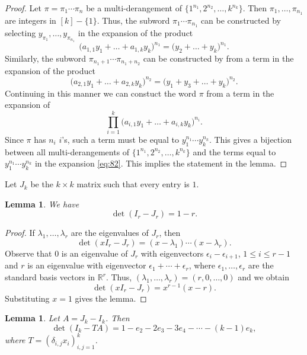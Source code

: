 \documentclass[oneside]{book}
\numberwithin{equation}{section}
\newtheorem{lem}[thm]{Lemma}
\theoremstyle{definition}
\newcommand{\RR}{\mathbb{R}}
\begin{document}
\begin{proof}
  Let \( \pi=\pi_1 \cdots \pi_n \) be a multi-derangement of
  \(\{1^{n_1}, 2^{n_2},\dots,k^{n_k}\}\). Then
  \( \pi_1,\dots,\pi_{n_1} \) are integers in \( [k]-\{1\} \).
  Thus, the subword \( \pi_1\cdots\pi_{n_1} \)
  can be constructed by selecting \( y_{\pi_1},\dots,y_{\pi_{n_1}} \)
  in the expansion of the product
  \[
    \bigl(a_{1,1}y_1 + \dots + a_{1,k}y_k \bigl)^{n_1}
    = \bigl(y_2 + \dots + y_k \bigl)^{n_1}.
  \]
  Similarly, the subword \( \pi_{n_1+1}\cdots\pi_{n_1+n_2} \) can be
  constructed by from a term in the expansion of the product
  \[
    \bigl(a_{2,1}y_1 + \dots + a_{2,k}y_k \bigl)^{n_2}
    = \bigl(y_1+ y_3 + \dots + y_k \bigl)^{n_2}.
  \]
  Continuing in this manner
  we can constuct the word \( \pi \)
  from a term in the expansion of 
  \begin{equation}\label{eq:82}
    \prod_{i=1}^k \bigl(a_{i,1}y_1 + \dots + a_{i,k}y_k \bigl)^{n_i}.
  \end{equation}
  Since \( \pi \) has \( n_i \) \( i \)'s, such a term must be equal
  to \( y_1^{n_1}\cdots y_k^{n_k} \). This gives a bijection between
  all multi-derangements of \(\{1^{n_1}, 2^{n_2},\dots,k^{n_k}\}\) and
  the terms equal to \( y_1^{n_1}\cdots y_k^{n_k} \) in the expansion
  \eqref{eq:82}. This implies the statement in the lemma.
\end{proof}

Let \( J_k \) be the \( k\times k \) matrix such that every entry is
\( 1 \).

\begin{lem}\label{lem:12}
  We have 
  \[
    \det(I_{r}-J_{r}) = 1-r.
  \]
\end{lem}

\begin{proof}
  If \( \lambda_1,\dots,\lambda_r \) are the eigenvalues of
  \( J_r \), then
  \[
    \det(xI_{r}-J_{r}) = (x-\lambda_1) \cdots (x-\lambda_r).
  \]
   Observe that \( 0 \) is an eigenvalue of \( J_r \) with
  eigenvectors \( \epsilon_i-\epsilon_{i+1} \), \( 1\le i\le r-1 \)
  and \( r \) is an eigenvalue with eigenvector
  \( \epsilon_1 + \cdots + \epsilon_r \), where
  \( \epsilon_1,\dots,\epsilon_r \) are the standard basis vectors in
  \( \RR^r \). Thus, \( (\lambda_1,\dots,\lambda_r) = (r,0,\dots,0) \)
  and we obtain
  \[
    \det(xI_{r}-J_{r}) = x^{r-1}(x-r).
  \]
  Substituting \( x=1 \) gives the lemma.
\end{proof}

\begin{lem}\label{lem:14}
  Let \( A = J_k-I_k \). Then
  \[
    \det(I_{k}-TA) = 1-e_2-2e_3-3e_4-\cdots-(k-1)e_k,
  \]
where \( T = (\delta_{i,j}x_i)_{i,j=1}^k \).
\end{lem}
\end{document}
